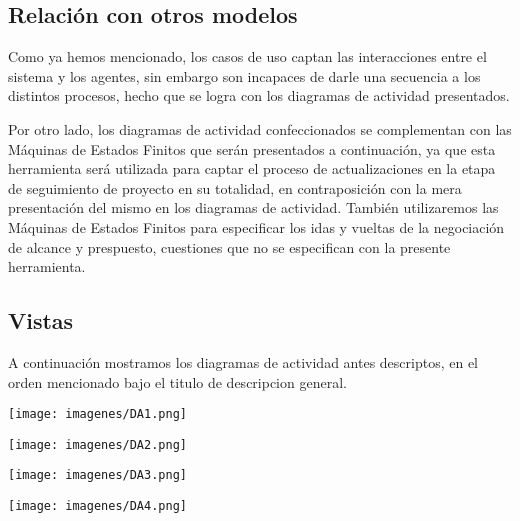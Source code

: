\subsection{Relación con otros modelos}
Como ya hemos mencionado, los casos de uso captan las interacciones entre el sistema y los agentes, sin embargo son incapaces de darle una secuencia a los distintos procesos, hecho que se logra con los diagramas de actividad presentados.

Por otro lado, los diagramas de actividad confeccionados se complementan con las Máquinas de Estados Finitos que serán presentados a continuación, ya que esta herramienta será utilizada para captar el proceso de actualizaciones en la etapa de seguimiento de proyecto en su totalidad, en contraposición con la mera presentación del mismo en los diagramas de actividad. También utilizaremos las Máquinas de Estados Finitos para especificar los idas y vueltas de la negociación de alcance y prespuesto, cuestiones que no se especifican con la presente herramienta.

\subsection{Vistas}
A continuación mostramos los diagramas de actividad antes descriptos, en el orden mencionado bajo el titulo de descripcion general.

\begin{center}
\begin{adjustbox}{max width = 1.1\textwidth}
\texttt{[image: imagenes/DA1.png]}
\end{adjustbox}
\end{center}

\newpage

\begin{center}
\begin{adjustbox}{max width = 1.1\textwidth}
\texttt{[image: imagenes/DA2.png]}
\end{adjustbox}
\end{center}

\newpage

\begin{center}
\begin{adjustbox}{max width = 1.1\textwidth}
\texttt{[image: imagenes/DA3.png]}
\end{adjustbox}
\end{center}

\newpage

\begin{center}
\begin{adjustbox}{max width = 1.1\textwidth}
\texttt{[image: imagenes/DA4.png]}
\end{adjustbox}
\end{center}
